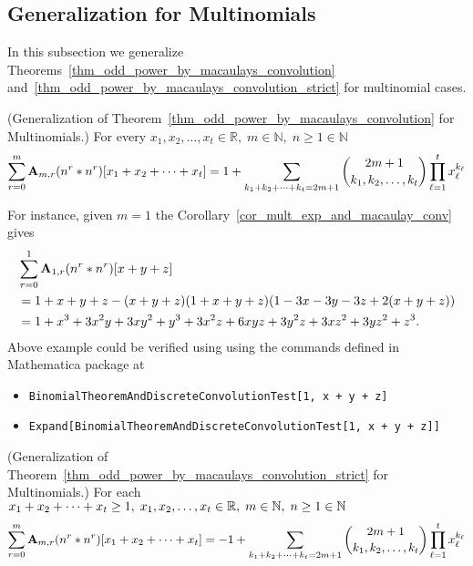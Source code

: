 \subsection{Generalization for Multinomials} \label{subsec:generalization-for-multinomials}
In this subsection we generalize
Theorems~\eqref{thm_odd_power_by_macaulays_convolution} and~\eqref{thm_odd_power_by_macaulays_convolution_strict}
for multinomial cases.
\begin{cor}
    \label{cor_mult_exp_and_macaulay_conv}
    (Generalization of Theorem~\ref{thm_odd_power_by_macaulays_convolution} for Multinomials.)
    For every $x_1, x_2, \ldots, x_t\in\mathbb{R}, \; m\in\mathbb{N}, \; n\geq1\in\mathbb{N}$
    \[
        \sum_{r=0}^{m} \coeffA{m}{r} \convPower{n}{r}{\multifoldSum{t}} =
        1 + \sum_{\multifoldSum[k]{t}=2m+1} \binom{2m+1}{k_1, k_2,\ldots, k_t} \prod_{\ell=1}^{t} x_\ell^{k_\ell}
    \]
\end{cor}
For instance, given $m=1$ the Corollary~\ref{cor_mult_exp_and_macaulay_conv} gives
\begin{equation*}
    \begin{split}
        &\sum_{r=0}^{1} \coeffA{1}{r} \convPower{n}{r}{x+y+z} \\
        &=1 + x + y + z - (x + y + z) (1 + x + y + z) (1 - 3 x - 3 y - 3 z + 2 (x + y + z)) \\
        &=1 + x^3 + 3 x^2 y + 3 x y^2 + y^3 + 3 x^2 z + 6 x y z + 3 y^2 z + 3 x z^2 + 3 y z^2 + z^3.
    \end{split}
\end{equation*}
Above example could be verified using using the commands defined in Mathematica package at~\cite{PK22Source}
\begin{itemize}
    \item \texttt{BinomialTheoremAndDiscreteConvolutionTest[1, x + y + z]}
    \item \texttt{Expand[BinomialTheoremAndDiscreteConvolutionTest[1, x + y + z]]}
\end{itemize}
\begin{cor}
    \label{cor_mult_exp_and_macaulay_conv_strict}
    (Generalization of Theorem~\ref{thm_odd_power_by_macaulays_convolution_strict} for Multinomials.)
    For each $\multifoldSum{t} \geq 1, \; x_1,x_2,\ldots,x_t\in\mathbb{R}, \; m\in\mathbb{N}, \; n\geq1\in\mathbb{N}$
    \[
        \sum_{r=0}^{m} \coeffA{m}{r} \convPower{n}{r}{\multifoldSum{t}} =
        -1 + \sum_{\multifoldSum[k]{t}=2m+1} \binom{2m+1}{k_1, k_2,\ldots, k_t} \prod_{\ell=1}^{t} x_\ell^{k_\ell}
    \]
\end{cor}
